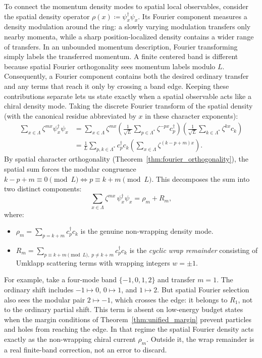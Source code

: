 To connect the momentum density modes to spatial local observables, consider
the spatial density operator $\rho(x) \coloneqq \psi_x^\dagger \psi_x$.
Its Fourier component measures a density modulation around the ring: a
slowly varying modulation transfers only nearby momenta, while a sharp
position-localized density contains a wider range of transfers. In an
unbounded momentum description, Fourier transforming simply labels the
transferred momentum. A finite centered band is different because spatial
Fourier orthogonality sees momentum labels modulo $L$. Consequently, a
Fourier component contains both the desired ordinary transfer and any terms
that reach it only by crossing a band edge. Keeping these contributions
separate lets us state exactly when a spatial observable acts like a
chiral density mode.
Taking the discrete Fourier transform of the spatial density (with the canonical residue abbreviated by $x$ in these character exponents):
\begin{align*}
\sum_{x \in \Lambda} \zeta^{m x} \psi_x^\dagger \psi_x &= \sum_{x \in \Lambda} \zeta^{m x} \left( \frac{1}{\sqrt{L}} \sum_{p \in \Lambda^*} \zeta^{-p x} c_p^\dagger \right) \left( \frac{1}{\sqrt{L}} \sum_{k \in \Lambda^*} \zeta^{k x} c_k \right) \\
&= \frac{1}{L} \sum_{p, k \in \Lambda^*} c_p^\dagger c_k \left( \sum_{x \in \Lambda} \zeta^{(k - p + m) x} \right).
\end{align*}
By spatial character orthogonality (Theorem~\ref{thm:fourier_orthogonality}), the spatial sum forces the modular congruence $k - p + m \equiv 0 \pmod L \iff p \equiv k + m \pmod L$.
This decomposes the sum into two distinct components:
\begin{equation}
\sum_{x \in \Lambda} \zeta^{m x}\, \psi_x^\dagger \psi_x = \rho_m + R_m,
\end{equation}
where:
\begin{itemize}
    \item $\rho_m = \sum_{p = k + m} c_p^\dagger c_k$ is the genuine non-wrapping density mode.
    \item $R_m = \sum_{p \equiv k + m \pmod L, \; p \neq k + m} c_p^\dagger c_k$ is the \emph{cyclic wrap remainder} consisting of Umklapp scattering terms with wrapping integers $w = \pm 1$.
\end{itemize}

For example, take a four-mode band $\{-1,0,1,2\}$ and transfer $m=1$.
The ordinary shift includes $-1\mapsto0$, $0\mapsto1$, and $1\mapsto2$.
But spatial Fourier selection also sees the modular pair $2\mapsto-1$,
which crosses the edge: it belongs to $R_1$, not to the ordinary partial
shift. This term is absent on low-energy budget states when the margin
conditions of Theorem~\ref{thm:unified_margin} prevent particles and holes
from reaching the edge. In that regime the spatial Fourier density acts
exactly as the non-wrapping chiral current $\rho_m$. Outside it, the wrap
remainder is a real finite-band correction, not an error to discard.

